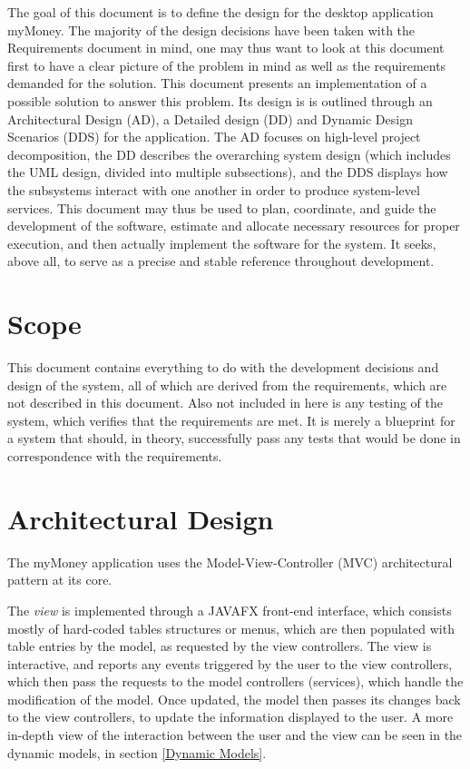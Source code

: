 \documentclass[12pt]{article}
\begin{document}
The goal of this document is to define the design for the desktop application myMoney. The majority of the design decisions have been taken     with the Requirements document in mind, one may thus want to look at this document first to have a clear picture of the problem in mind as well as the requirements demanded for the solution. This document presents an implementation of a possible solution to answer this problem. Its design is is outlined through an Architectural Design (AD), a Detailed design (DD) and Dynamic Design Scenarios (DDS) for the application. The AD focuses on high-level project decomposition, the DD describes the overarching system design (which includes the UML design, divided into multiple subsections), and the DDS displays how the subsystems interact with one another in order to produce system-level services. This document may thus be used to plan, coordinate, and guide the development of the software, estimate and allocate necessary resources for proper execution, and  then actually implement the software for the system. It seeks, above all, to serve as a precise and stable reference throughout development.

\section{Scope}

This document contains everything to do with the development decisions and design of the system, all of which are derived from the requirements, which are not described in this document. Also not included in here is any testing of the system, which verifies that the requirements are met. It is merely a blueprint for a system that should, in theory, successfully pass any tests that would be done in correspondence with the requirements.

\section{Architectural Design} \label{sec:arch}

The myMoney application uses the Model-View-Controller (MVC) architectural pattern at its core.

The \textit{view} is implemented through a JAVAFX front-end interface, which consists mostly of hard-coded tables structures or menus, which are then populated with table entries by the model, as requested by the view controllers. The view is interactive, and reports any events triggered by the user to the view controllers, which then pass the requests to the model controllers (services), which handle the modification of the model. Once updated, the model then passes its changes back to the view controllers, to update the information displayed to the user. A more in-depth view of the interaction between the user and the view can be seen in the dynamic models, in section \ref{Dynamic Models}.
\end{document}
